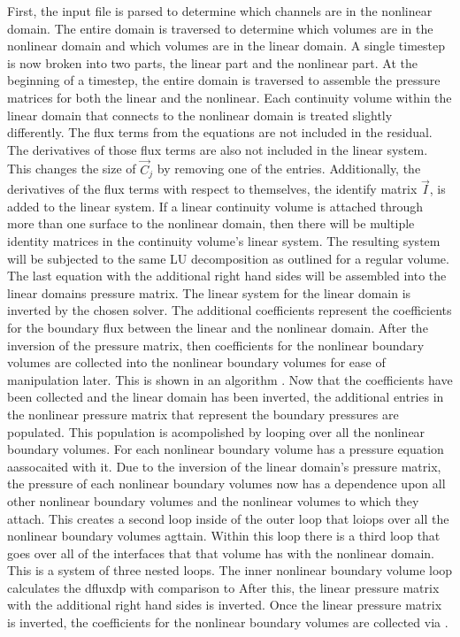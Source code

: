 First, the input file is parsed to determine which channels are in the nonlinear domain.
The entire domain is traversed to determine which volumes are in the nonlinear domain and which volumes are in the linear domain.
A single timestep is now broken into two parts, the linear part and the nonlinear part.
At the beginning of a timestep, the entire domain is traversed to assemble the pressure matrices for both the linear and the nonlinear.
Each continuity volume within the linear domain that connects to the nonlinear domain is treated slightly differently.
The flux terms from the equations are not included in the residual.
The derivatives of those flux terms are also not included in the linear system.
This changes the size of $\vec{C}_{j}$ by removing one of the entries.
Additionally, the derivatives of the flux terms with respect to themselves, the identify matrix $\vec{I}$, is added to the linear system.
If a linear continuity volume is attached through more than one surface to the nonlinear domain, then there will be multiple identity matrices in the continuity volume's linear system.
The resulting system will be subjected to the same LU decomposition as outlined for a regular volume.
The last equation with the additional right hand sides will be assembled into the linear domains pressure matrix.
The linear system for the linear domain is inverted by the chosen solver.
The additional coefficients represent the coefficients for the boundary flux between the linear and the nonlinear domain.
After the inversion of the pressure matrix, then coefficients for the nonlinear boundary volumes are collected into the nonlinear boundary volumes for ease of manipulation later.
This is shown in an algorithm .
Now that the coefficients have been collected and the linear domain has been inverted, the additional entries in the nonlinear pressure matrix that represent the boundary pressures are populated.
This population is acompolished by looping over all the nonlinear boundary volumes.
For each nonlinear boundary volume  has a pressure equation aassocaited with it.
Due to the inversion of the linear domain's pressure matrix, the pressure of each nonlinear boundary volumes now has a dependence upon all other nonlinear boundary volumes and the nonlinear volumes to which they attach.
This creates a second loop inside of the outer loop that loiops over all the nonlinear boundary volumes agttain.
Within this loop there is a third loop that goes over all of the interfaces that that volume has with the nonlinear domain.
This is a system of three nested loops.
The inner nonlinear boundary volume loop calculates the dfluxdp with comparison to 
After this, the linear pressure matrix with the additional right hand sides is inverted.
Once the linear pressure matrix is inverted, the coefficients for the nonlinear boundary volumes are collected via .

